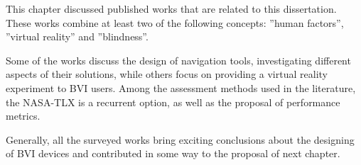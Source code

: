 This chapter discussed published works that are related to this dissertation. These works combine at least two of the following concepts: ”human factors”, ”virtual reality” and ”blindness”. 

Some of the works discuss the design of navigation tools, investigating different aspects of their solutions, while others focus on providing a virtual reality experiment to BVI users. Among the assessment methods used in the literature, the NASA-TLX is a recurrent option, as well as the proposal of performance metrics.

Generally, all the surveyed works bring exciting conclusions about the designing of BVI devices and contributed in some way to the proposal of next chapter.

